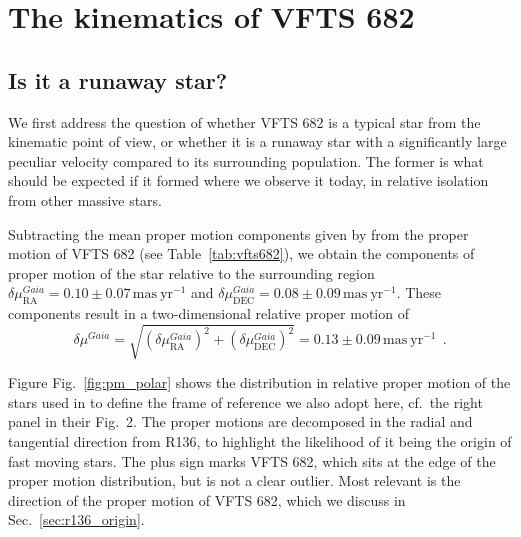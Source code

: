 \documentclass[a4paper,fleqn,usenatbib]{mnras}
\DeclareRobustCommand{\Figref}[1]{Fig.~\ref{#1}}
\DeclareRobustCommand{\Tabref}[1]{Table~\ref{#1}}
\DeclareRobustCommand{\Secref}[1]{Sec.~\ref{#1}}
\begin{document}
\section{The kinematics of VFTS 682}
\label{sec:results}

\subsection{Is it a runaway star?}
\label{sec:runaway}
We first address the question of whether VFTS 682 is a typical star
from the kinematic point of view, or whether it is a runaway star with
a significantly large peculiar velocity compared to its surrounding population. The former is what should
be expected if it formed where we observe it today, in relative
isolation from other massive stars.

Subtracting the mean proper motion components given by
\citep{lennon:18} from the
proper motion of VFTS 682 (see \Tabref{tab:vfts682}), we obtain the
components of proper motion of the star relative to the surrounding region
$\delta\mu_\mathrm{RA}^{Gaia} = 0.10 \pm 0.07\,\mathrm{mas\ yr^{-1}}$
and $\delta\mu_\mathrm{DEC}^{Gaia} = 0.08
\pm 0.09\,\mathrm{mas\ yr^{-1}}$. These components result in a
two-dimensional relative proper motion of
\begin{equation}
  \label{eq:pm_gaia_around}
  \delta \mu^{Gaia} = \sqrt{\left(\delta\mu_\mathrm{RA}^{Gaia}\right)^2+\left(\delta\mu_\mathrm{DEC}^{Gaia}\right)^2}
  = 0.13\pm 0.09\,\mathrm{mas\
  yr^{-1}} \ \ .
\end{equation}

Figure \Figref{fig:pm_polar} shows the distribution in relative proper motion
of the stars used in \cite{lennon:18} to define the frame of reference
we also adopt here, cf.~the right panel in their Fig.~2. The
proper motions are decomposed in the radial and tangential direction
from R136, to highlight the likelihood of it being the origin of fast
moving stars. The plus sign marks VFTS 682, which sits at the edge of
the proper motion distribution, but is not a clear outlier. Most
relevant is the direction of the proper motion of VFTS 682, which we
discuss in \Secref{sec:r136_origin}.
\end{document}
